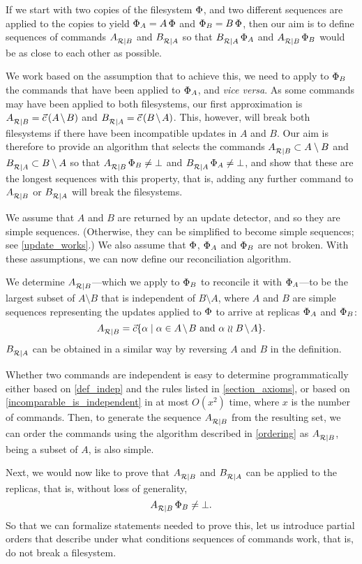 
If we start with two copies of the filesystem $\Phi$,
and two different sequences are applied to the copies to yield $\Phi_A=A\,\Phi$
and $\Phi_B=B\,\Phi$, then our aim is to define sequences of commands ${A}^{}_{\mathcal{R}|{B}}$ and ${B}^{}_{\mathcal{R}|{A}}$
so that ${B}^{}_{\mathcal{R}|{A}}\,\Phi_A$ and ${A}^{}_{\mathcal{R}|{B}}\,\Phi_B$ would be as close to each other as possible.

We work based on the assumption that to achieve this, we need
to apply to $\Phi_B$ the commands that have been applied to $\Phi_A$, and \emph{vice versa}.
As some commands may have been applied to both filesystems, our first approximation
is $\reca = \amb$ and $\recb = \bma$.
This, however, will break both filesystems if there have been incompatible updates
in $A$ and $B$. 
Our aim is therefore to provide an algorithm that selects the commands 
${A}^{}_{\mathcal{R}|{B}} \subset A\setminus B$
and ${B}^{}_{\mathcal{R}|{A}} \subset B\setminus A$ 
so that ${A}^{}_{\mathcal{R}|{B}}\,\Phi_B\neq\bot$ and ${B}^{}_{\mathcal{R}|{A}}\,\Phi_A\neq\bot$,
and show that these are the longest sequences with this property, that is,
adding any further command to ${A}^{}_{\mathcal{R}|{B}}$ or ${B}^{}_{\mathcal{R}|{A}}$ will break the filesystems.

We assume that $A$ and $B$ are returned by an update detector,
and so they are simple sequences.
(Otherwise, they can be simplified to become simple sequences; see \cref{update_works}.)
We also assume that $\Phi$, $\Phi_A$ and $\Phi_B$ are not broken.
With these assumptions,
we can now define our reconciliation algorithm.

\begin{mydef}[Reconciliation]
We determine ${A}^{}_{\mathcal{R}|{B}}$---which we apply to $\Phi_B$ 
to reconcile it with $\Phi_A$---to be
the largest subset of $A\setminus B$
that is independent of $B\setminus A$,
where $A$ and $B$ are simple sequences representing
the updates applied to $\Phi$ to arrive at replicas $\Phi_A$ and $\Phi_B$:
\[ \reca = \ords{\alpha \whr \alpha\in \ambnp  \mbox{~and~}  \alpha\indep \bmanp }. \]
${B}^{}_{\mathcal{R}|{A}}$ can be obtained in a similar way by reversing $A$ and $B$
in the definition.
\end{mydef}

Whether two commands are independent is easy to determine programmatically
either based on \cref{def_indep} and the rules listed in \cref{section_axioms},
or based on \cref{incomparable_is_independent} 
in at most $O(x^2)$ time, where $x$ is the number of commands.
Then, to generate the sequence ${A}^{}_{\mathcal{R}|{B}}$ from the resulting set, 
we can order the commands using the algorithm described in
\cref{ordering} as ${A}^{}_{\mathcal{R}|{B}}$, being a subset of $A$, is also simple.


\myskip
Next, we would now like to prove that ${A}^{}_{\mathcal{R}|{B}}$ and ${B}^{}_{\mathcal{R}|{A}}$ can be applied to the replicas,
that is, without loss of generality,
\[ {A}^{}_{\mathcal{R}|{B}}\,\Phi_B\neq\bot. \]
So that we can formalize statements needed to prove this,
let us introduce partial orders that describe under what conditions
sequences of commands work, that is, do not break a filesystem.
